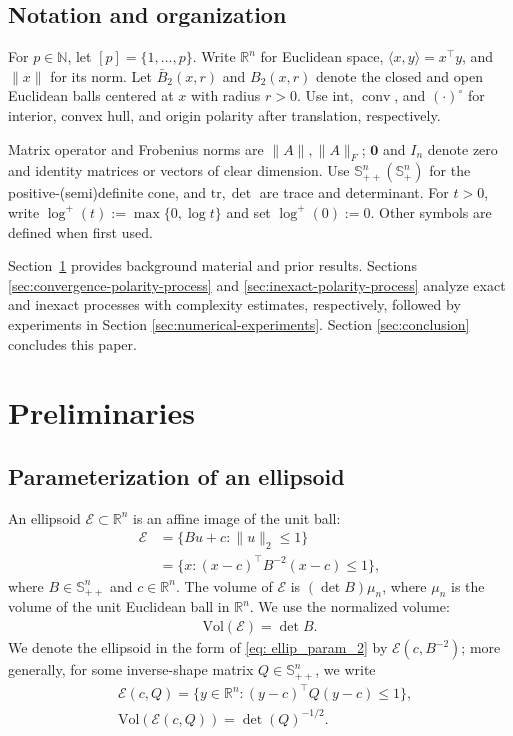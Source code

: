 \documentclass[smallextended]{svjour3}
\DeclareMathOperator{\conv}{conv}
\newcommand{\N}{\mathbb{N}}
\newcommand{\R}{\mathbb{R}}
\newcommand{\E}{\mathcal{E}}
\newcommand{\tr}{\mathrm{tr}}
\newcommand{\Vol}{\mathrm{Vol}}
\renewcommand{\S}{\mathbb{S}}
\begin{document}
\subsection{Notation and organization}\label{sec: notation}
For $p\in\N$, let $[p]=\{1,\ldots,p\}$. Write $\R^n$ for Euclidean space,
$\langle x,y\rangle=x^\top y$, and $\|x\|$ for its norm. 
Let $\bar B_2(x,r)$ and $B_2(x,r)$ denote the closed and open Euclidean balls
centered at $x$ with radius $r>0$. Use $\mathrm{int}$, $\conv$,
and $(\cdot)^\circ$ for interior, convex hull, and
origin polarity after translation, respectively. 

Matrix operator and Frobenius norms are $\|A\|,\|A\|_F$; $\mathbf0$ and $I_n$ denote zero and
identity matrices or vectors of clear dimension. Use $\S^n_{++}(\S^n_+)$ for the positive-(semi)definite cone,
and $\tr,\det$ are trace and determinant. For $t>0$, write $\log^+(t):=\max\{0,\log t\}$ and set $\log^+(0):=0$.
Other symbols are defined when first used.

Section~\ref{sec: preliminaries} provides background material and prior
results. Sections \ref{sec:convergence-polarity-process} and
\ref{sec:inexact-polarity-process} analyze exact and inexact processes with complexity estimates, respectively, 
followed by experiments in Section \ref{sec:numerical-experiments}. Section \ref{sec:conclusion} concludes this paper.

\section{Preliminaries}\label{sec: preliminaries}
\subsection{Parameterization of an ellipsoid}
An ellipsoid $\E\subset\R^n$ is an affine image of the unit ball:
\begin{subequations}\label{eq: ellip_param}
\begin{align}
    \E &= \{Bu + c : \|u\|_2 \leq 1\} \label{eq: ellip_param_1}\\
       &= \{x : (x-c)^\top B^{-2}(x-c) \leq 1\}, \label{eq: ellip_param_2}
\end{align}
\end{subequations}
where $B\in\S^n_{++}$ and $c\in\R^n$. The volume of $\E$ is $(\det B)\mu_n$, where $\mu_n$
is the volume of the unit Euclidean ball in $\R^n$. We use the normalized volume:
\begin{align}\label{eq: scaled_ellip_volume}
    \mathrm{Vol}(\E) = \det B.
\end{align}
We denote the ellipsoid in the form of \eqref{eq: ellip_param_2} by $\E(c,B^{-2})$; more generally,
for some inverse-shape matrix $Q\in \S^n_{++}$, we write
\begin{align}
    & \E(c,Q)=  \{y\in\R^n:(y-c)^\top Q(y-c)\le1\}, \\
    & \Vol(\E(c,Q))= \det(Q)^{-1/2}.
\end{align}
\end{document}
